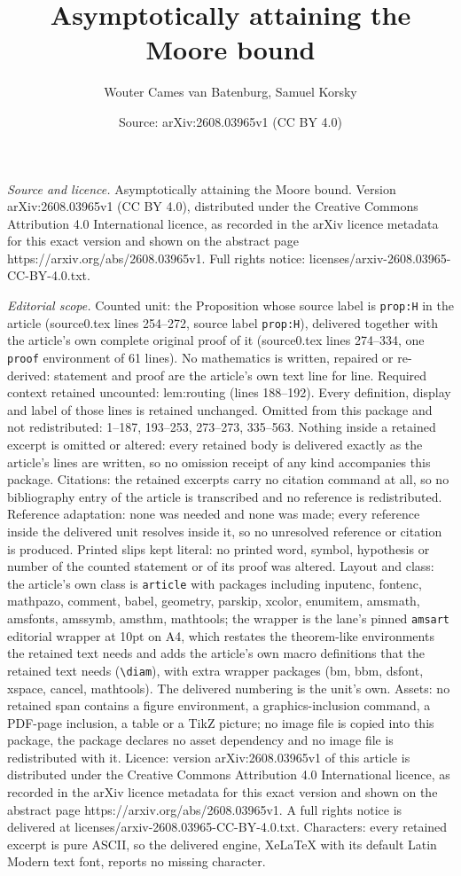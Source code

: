 \documentclass[10pt,a4paper]{amsart}
\title[Asymptotically attaining the Moore bound]{Asymptotically attaining the Moore bound}
\author{Wouter Cames van Batenburg, Samuel Korsky}
\date{Source: arXiv:2608.03965v1 (CC BY 4.0)}
\begin{document}
\maketitle

\noindent\emph{Source and licence.} Asymptotically attaining the Moore bound. Version arXiv:2608.03965v1 (CC BY 4.0), distributed under the Creative Commons Attribution 4.0 International licence, as recorded in the arXiv licence metadata for this exact version and shown on the abstract page https://arxiv.org/abs/2608.03965v1. Full rights notice: licenses/arxiv-2608.03965-CC-BY-4.0.txt.\par\smallskip

\noindent\textit{Editorial scope.} Counted unit: the Proposition whose source label is \texttt{prop:H} in the article (source0.tex lines 254--272, source label \texttt{prop:H}), delivered together with the article's own complete original proof of it (source0.tex lines 274--334, one \texttt{proof} environment of 61 lines). No mathematics is written, repaired or re-derived: statement and proof are the article's own text line for line. Required context retained uncounted: lem:routing (lines 188--192). Every definition, display and label of those lines is retained unchanged. Omitted from this package and not redistributed: 1--187, 193--253, 273--273, 335--563. Nothing inside a retained excerpt is omitted or altered: every retained body is delivered exactly as the article's lines are written, so no omission receipt of any kind accompanies this package. Citations: the retained excerpts carry no citation command at all, so no bibliography entry of the article is transcribed and no reference is redistributed. Reference adaptation: none was needed and none was made; every reference inside the delivered unit resolves inside it, so no unresolved reference or citation is produced. Printed slips kept literal: no printed word, symbol, hypothesis or number of the counted statement or of its proof was altered. Layout and class: the article's own class is \texttt{article} with packages including inputenc, fontenc, mathpazo, comment, babel, geometry, parskip, xcolor, enumitem, amsmath, amsfonts, amssymb, amsthm, mathtools; the wrapper is the lane's pinned \texttt{amsart} editorial wrapper at 10pt on A4, which restates the theorem-like environments the retained text needs and adds the article's own macro definitions that the retained text needs (\texttt{\textbackslash diam}), with extra wrapper packages (bm, bbm, dsfont, xspace, cancel, mathtools). The delivered numbering is the unit's own. Assets: no retained span contains a figure environment, a graphics-inclusion command, a PDF-page inclusion, a table or a TikZ picture; no image file is copied into this package, the package declares no asset dependency and no image file is redistributed with it. Licence: version arXiv:2608.03965v1 of this article is distributed under the Creative Commons Attribution 4.0 International licence, as recorded in the arXiv licence metadata for this exact version and shown on the abstract page https://arxiv.org/abs/2608.03965v1. A full rights notice is delivered at licenses/arxiv-2608.03965-CC-BY-4.0.txt. Characters: every retained excerpt is pure ASCII, so the delivered engine, XeLaTeX with its default Latin Modern text font, reports no missing character.
\end{document}
